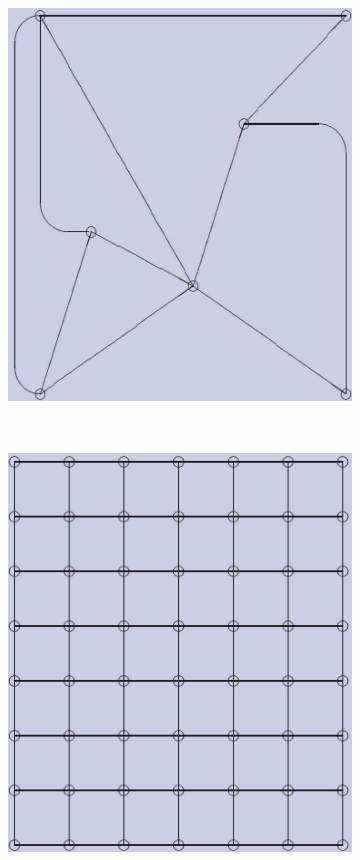 \documentclass[12pt]{article}
\begin{document}
\begin{figure}[tb]
  \centering

  \begin{subfigure}[b]{0.2\textwidth}
      \includegraphics[width=\textwidth]{img/contract_kernel1}
      \caption{}\label{fig:contract_kernel1}
  \end{subfigure}
  ~
  \begin{subfigure}[b]{0.2\textwidth}
      \includegraphics[width=\textwidth]{img/contract_kernel2}

\end{subfigure}
\end{figure}
\end{document}

